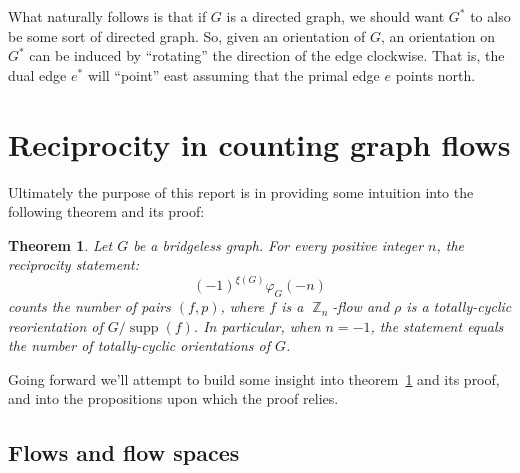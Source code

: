\documentclass{amsart}
\DeclareMathOperator{\Z}{\mathbb{Z}}
\DeclareMathOperator{\sgsupp}{supp}
\theoremstyle{plain}
\newtheorem{thm}{Theorem}
\theoremstyle{remark}
\theoremstyle{definition}
\begin{document}
What naturally follows is that if $G$ is a directed graph, we should want
$G^*$ to also be some sort of directed graph.
So, given an orientation of $G$, an orientation on $G^*$ can be induced by
``rotating'' the direction of the edge clockwise. That is, the dual edge $e^*$
will ``point'' east assuming that the primal edge $e$ points north.


\pagebreak
\section{Reciprocity in counting graph flows}

Ultimately the purpose of this report is in providing some intuition into the
following theorem and its proof:
\begin{thm}\label{thm:1.2.5}
  Let $G$ be a bridgeless graph. For every positive integer $n$, the
  reciprocity statement:
  \[
    {(-1)}^{\xi(G)}\varphi_G(-n)
  \]
  counts the number of pairs $(f,p)$,
  where $f$ is a $\Z_n$-flow and $\rho$ is a totally-cyclic reorientation of
  $G/\sgsupp(f)$. In particular, when $n=-1$, the statement equals the
  number of totally-cyclic orientations of $G$.
\end{thm}

Going forward we'll attempt to build some insight into theorem~\ref{thm:1.2.5}
and its proof, and into the propositions upon which the proof relies.

\subsection{Flows and flow spaces}
\end{document}
